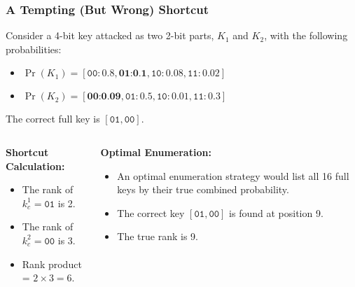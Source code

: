 \begin{frame}
    \frametitle{A Tempting (But Wrong) Shortcut}
    
    Consider a 4-bit key attacked as two 2-bit parts, $K_1$ and $K_2$, with the following probabilities:
    \begin{itemize}
        \item $\Pr(K_1) = [\texttt{00}:0.8, \textbf{01:0.1}, \texttt{10}:0.08, \texttt{11}:0.02]$
        \item $\Pr(K_2) = [\textbf{00:0.09}, \texttt{01}:0.5, \texttt{10}:0.01, \texttt{11}:0.3]$
    \end{itemize}
    The correct full key is $[\texttt{01}, \texttt{00}]$.
    
    \begin{columns}[T]
    \begin{column}{0.5\textwidth}
        \textbf{Shortcut Calculation:}
        \begin{itemize}
            \item The rank of $k_c^1=\texttt{01}$ is 2.
            \item The rank of $k_c^2=\texttt{00}$ is 3.
            \item Rank product = $2 \times 3 = 6$.
        \end{itemize}
    \end{column}
    \begin{column}{0.5\textwidth}
        \textbf{Optimal Enumeration:}
        \begin{itemize}
            \item An optimal enumeration strategy would list all 16 full keys by their true combined probability.
            \item The correct key $[\texttt{01},\texttt{00}]$ is found at position 9.
            \item The true rank is 9.
        \end{itemize}
    \end{column}
    \end{columns}
    
\end{frame}


